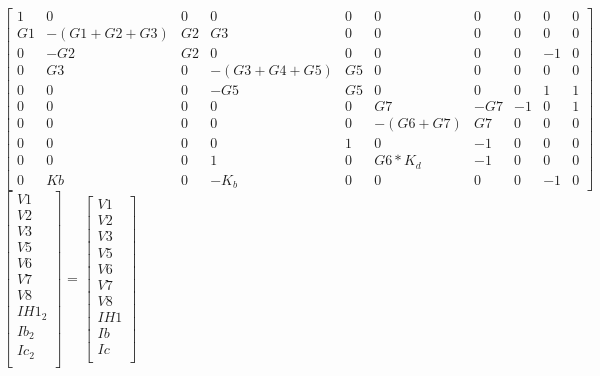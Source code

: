 {\footnotesize

$ \begin{bmatrix}
1 & 0 & 0 & 0 & 0 & 0 & 0 & 0 & 0 & 0 \\
G1 & -(G1+G2+G3) & G2 & G3 & 0 & 0 & 0 & 0 & 0 & 0 \\
0 & -G2 & G2 & 0 & 0 & 0 & 0 & 0 & -1 & 0 \\
0 & G3 & 0 & -(G3+G4+G5) & G5 & 0 & 0 & 0 & 0 & 0 \\
0 & 0 & 0 & -G5 & G5 & 0 & 0 & 0 & 1 & 1 \\
0 & 0 & 0 & 0 & 0 & G7 & -G7 & -1 & 0 & 1 \\
0 & 0 & 0 & 0 & 0 & -(G6+G7) & G7 & 0 & 0 & 0 \\
0 & 0 & 0 & 0 & 1 & 0 & -1 & 0 & 0 & 0 \\
0 & 0 & 0 & 1 & 0 & G6*K_d & -1 & 0 & 0 & 0 \\
0 & Kb & 0 & -K_b & 0 & 0 & 0 & 0 & -1 & 0 
\end{bmatrix}  $
$ \begin{bmatrix}
V1 \\
V2 \\
V3 \\
V5 \\
V6 \\
V7 \\
V8 \\
IH1_2 \\
Ib_2 \\
Ic_2 \\
\end{bmatrix}  $
=
$ \begin{bmatrix}
V1 \\
V2 \\
V3 \\
V5 \\
V6 \\
V7 \\
V8 \\
IH1 \\
Ib \\
Ic \\
\end{bmatrix}  $

}
